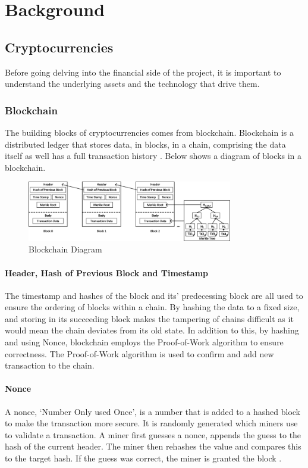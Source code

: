 \chapter{Background}

\section{Cryptocurrencies}
Before going delving into the financial side of the project, it is important to understand the underlying assets and the technology that drive them.

\subsection{Blockchain}
The building blocks of cryptocurrencies comes from blockchain. Blockchain is a distributed ledger that stores data, in blocks, in a chain, comprising the data itself as well has a full transaction history \cite{nofer2017blockchain}. Below shows a diagram of blocks in a blockchain.

\begin{figure}[!htb]
    \centering
    \includegraphics[width=0.8\textwidth]{background/Images/The-structure-of-a-Blockchain.png}
    \caption{Blockchain Diagram \cite{inbookBlockchain}}
\end{figure}

\subsubsection{Header, Hash of Previous Block and Timestamp}
The timestamp and hashes of the block and its' predecessing block are all used to ensure the ordering of blocks within a chain. By hashing the data to a fixed size, and storing in its succeeding block makes the tampering of chains difficult as it would mean the chain deviates from its old state. In addition to this, by hashing and using Nonce, blockchain employs the Proof-of-Work algorithm to ensure correctness. The Proof-of-Work algorithm is used to confirm and add new transaction to the chain.

\subsubsection{Nonce}
A nonce, `Number Only used Once', is a number that is added to a hashed block to make the transaction more secure. It is randomly generated which miners use to validate a transaction. A miner first guesses a nonce, appends the guess to the hash of the current header. The miner then rehashes the value and compares this to the target hash. If the guess was correct, the miner is granted the block \cite{noauthor_components_2021}. 

